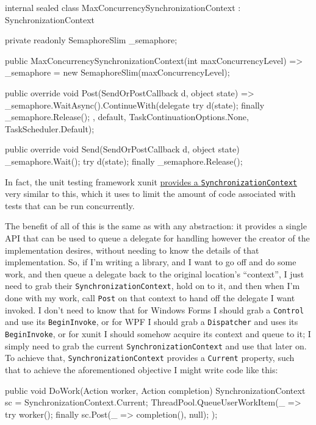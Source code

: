 \documentclass[a4paper,12pt,notitlepage,twoside,openright]{article}
\begin{document}
\begin{csharpcode}
internal sealed class MaxConcurrencySynchronizationContext : SynchronizationContext
{
    private readonly SemaphoreSlim _semaphore;

    public MaxConcurrencySynchronizationContext(int maxConcurrencyLevel) =>
        _semaphore = new SemaphoreSlim(maxConcurrencyLevel);

    public override void Post(SendOrPostCallback d, object state) =>
        _semaphore.WaitAsync().ContinueWith(delegate
        {
            try { d(state); } finally { _semaphore.Release(); }
        }, default, TaskContinuationOptions.None, TaskScheduler.Default);

    public override void Send(SendOrPostCallback d, object state)
    {
        _semaphore.Wait();
        try { d(state); } finally { _semaphore.Release(); }
    }
}
\end{csharpcode}

In fact, the unit testing framework xunit
\href{https://github.com/xunit/xunit/blob/d81613bf752bb4b8774e9d4e77b2b62133b0d333/src/xunit.execution/Sdk/MaxConcurrencySyncContext.cs}{provides
a \texttt{SynchronizationContext}} very similar to this, which it uses
to limit the amount of code associated with tests that can be run
concurrently.

The benefit of all of this is the same as with any abstraction: it
provides a single API that can be used to queue a delegate for handling
however the creator of the implementation desires, without needing to
know the details of that implementation. So, if I'm writing a library,
and I want to go off and do some work, and then queue a delegate back to
the original location's ``context'', I just need to grab their
\texttt{SynchronizationContext}, hold on to it, and then when I'm done
with my work, call \texttt{Post} on that context to hand off the
delegate I want invoked. I don't need to know that for Windows Forms I
should grab a \texttt{Control} and use its \texttt{BeginInvoke}, or for
WPF I should grab a \texttt{Dispatcher} and uses its
\texttt{BeginInvoke}, or for xunit I should somehow acquire its context
and queue to it; I simply need to grab the current
\texttt{SynchronizationContext} and use that later on. To achieve that,
\texttt{SynchronizationContext} provides a \texttt{Current} property,
such that to achieve the aforementioned objective I might write code
like this:

\begin{csharpcode}
public void DoWork(Action worker, Action completion)
{
    SynchronizationContext sc = SynchronizationContext.Current;
    ThreadPool.QueueUserWorkItem(_ =>
    {
        try { worker(); }
        finally { sc.Post(_ => completion(), null); }
    });
}
\end{csharpcode}
\end{document}

